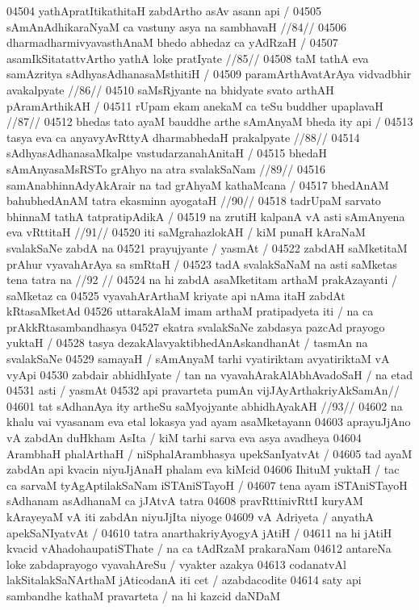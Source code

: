 04504 	yathApratItikathitaH zabdArtho asAv asann api /
04505 	sAmAnAdhikaraNyaM ca vastuny asya na sambhavaH //84// 
04506 	dharmadharmivyavasthAnaM bhedo abhedaz ca yAdRzaH /  
04507 	asamIkSitatattvArtho yathA loke pratIyate //85//
04508 	taM tathA eva samAzritya sAdhyasAdhanasaMsthitiH / 
04509 	paramArthAvatArAya vidvadbhir avakalpyate //86// 
04510 	saMsRjyante na bhidyate svato arthAH pAramArthikAH / 
04511 	rUpam ekam anekaM ca teSu buddher upaplavaH //87//
04512 	bhedas tato ayaM bauddhe arthe sAmAnyaM bheda ity api /
04513 	tasya eva ca anyavyAvRttyA dharmabhedaH prakalpyate //88//  
04514 	sAdhyasAdhanasaMkalpe vastudarzanahAnitaH / 
04515 	bhedaH sAmAnyasaMsRSTo grAhyo na atra svalakSaNam //89//
04516 	samAnabhinnAdyAkArair na tad grAhyaM kathaMcana /  
04517 	bhedAnAM bahubhedAnAM tatra ekasminn ayogataH //90//
04518 	tadrUpaM sarvato bhinnaM tathA tatpratipAdikA / 
04519 	na zrutiH kalpanA vA asti sAmAnyena eva vRttitaH //91// 
04520 iti saMgrahazlokAH / kiM punaH kAraNaM svalakSaNe zabdA na 
04521 prayujyante / yasmAt /
04522 	zabdAH saMketitaM prAhur vyavahArAya sa smRtaH /  
04523 	tadA svalakSaNaM na asti saMketas tena tatra na //92 //
04524 na hi zabdA asaMketitam arthaM prakAzayanti / saMketaz ca
04525 vyavahArArthaM kriyate api nAma itaH zabdAt kRtasaMketAd  
04526 uttarakAlaM imam arthaM pratipadyeta iti / na ca prAkkRtasambandhasya
04527 ekatra svalakSaNe zabdasya pazcAd prayogo yuktaH /  
04528 tasya dezakAlavyaktibhedAnAskandhanAt / tasmAn na svalakSaNe  
04529 samayaH / sAmAnyaM tarhi vyatiriktam avyatiriktaM vA vyApi
04530 zabdair abhidhIyate / tan na vyavahArakAlAbhAvadoSaH / na etad 
04531 asti / yasmAt
04532 	api pravarteta pumAn vijJAyArthakriyAkSamAn//  
04601 	tat sAdhanAya ity artheSu saMyojyante abhidhAyakAH //93//  
04602 na khalu vai vyasanam eva etal lokasya yad ayam asaMketayann  
04603 aprayuJjAno vA zabdAn duHkham AsIta / kiM tarhi sarva eva asya avadheya
04604 ArambhaH phalArthaH / niSphalArambhasya upekSanIyatvAt / 
04605 tad ayaM zabdAn api kvacin niyuJjAnaH phalam eva kiMcid  
04606 IhituM yuktaH / tac ca sarvaM tyAgAptilakSaNam iSTAniSTayoH /  
04607 tena ayam iSTAniSTayoH sAdhanam asAdhanaM ca jJAtvA tatra  
04608 pravRttinivRttI kuryAM kArayeyaM vA iti zabdAn niyuJjIta niyoge 
04609 vA Adriyeta / anyathA apekSaNIyatvAt / 
04610 	tatra anarthakriyAyogyA jAtiH /
04611 na hi jAtiH kvacid vAhadohaupatiSThate / na ca tAdRzaM prakaraNam 
04612 antareNa loke zabdaprayogo vyavahAreSu / vyakter azakya 
04613 codanatvAl lakSitalakSaNArthaM jAticodanA iti cet / azabdacodite  
04614 saty api sambandhe kathaM pravarteta / na hi kazcid daNDaM 
